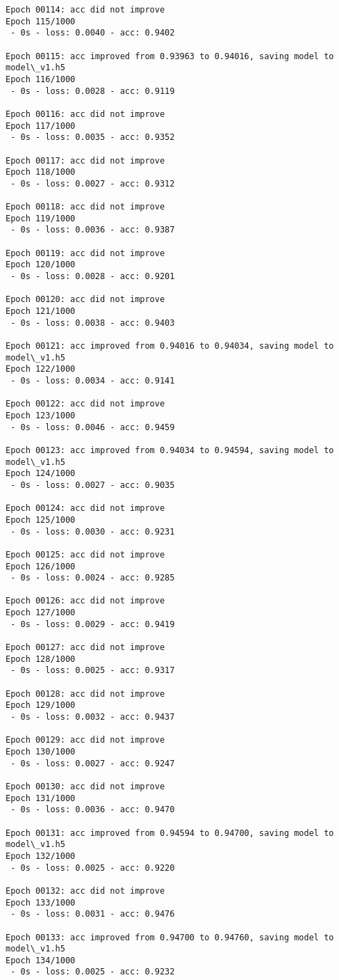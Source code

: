 \documentclass[11pt]{article}
\begin{document}
\begin{Verbatim}[commandchars=\\\{\}]
Epoch 00114: acc did not improve
Epoch 115/1000
 - 0s - loss: 0.0040 - acc: 0.9402

Epoch 00115: acc improved from 0.93963 to 0.94016, saving model to model\_v1.h5
Epoch 116/1000
 - 0s - loss: 0.0028 - acc: 0.9119

Epoch 00116: acc did not improve
Epoch 117/1000
 - 0s - loss: 0.0035 - acc: 0.9352

Epoch 00117: acc did not improve
Epoch 118/1000
 - 0s - loss: 0.0027 - acc: 0.9312

Epoch 00118: acc did not improve
Epoch 119/1000
 - 0s - loss: 0.0036 - acc: 0.9387

Epoch 00119: acc did not improve
Epoch 120/1000
 - 0s - loss: 0.0028 - acc: 0.9201

Epoch 00120: acc did not improve
Epoch 121/1000
 - 0s - loss: 0.0038 - acc: 0.9403

Epoch 00121: acc improved from 0.94016 to 0.94034, saving model to model\_v1.h5
Epoch 122/1000
 - 0s - loss: 0.0034 - acc: 0.9141

Epoch 00122: acc did not improve
Epoch 123/1000
 - 0s - loss: 0.0046 - acc: 0.9459

Epoch 00123: acc improved from 0.94034 to 0.94594, saving model to model\_v1.h5
Epoch 124/1000
 - 0s - loss: 0.0027 - acc: 0.9035

Epoch 00124: acc did not improve
Epoch 125/1000
 - 0s - loss: 0.0030 - acc: 0.9231

Epoch 00125: acc did not improve
Epoch 126/1000
 - 0s - loss: 0.0024 - acc: 0.9285

Epoch 00126: acc did not improve
Epoch 127/1000
 - 0s - loss: 0.0029 - acc: 0.9419

Epoch 00127: acc did not improve
Epoch 128/1000
 - 0s - loss: 0.0025 - acc: 0.9317

Epoch 00128: acc did not improve
Epoch 129/1000
 - 0s - loss: 0.0032 - acc: 0.9437

Epoch 00129: acc did not improve
Epoch 130/1000
 - 0s - loss: 0.0027 - acc: 0.9247

Epoch 00130: acc did not improve
Epoch 131/1000
 - 0s - loss: 0.0036 - acc: 0.9470

Epoch 00131: acc improved from 0.94594 to 0.94700, saving model to model\_v1.h5
Epoch 132/1000
 - 0s - loss: 0.0025 - acc: 0.9220

Epoch 00132: acc did not improve
Epoch 133/1000
 - 0s - loss: 0.0031 - acc: 0.9476

Epoch 00133: acc improved from 0.94700 to 0.94760, saving model to model\_v1.h5
Epoch 134/1000
 - 0s - loss: 0.0025 - acc: 0.9232


\end{Verbatim}
\end{document}
